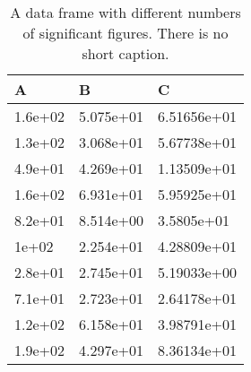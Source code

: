 \begin{table}[h!]
\caption{A data frame with different numbers of significant figures. There is no short caption.}\label{df2}\begin{center}
\begin{tabular}{l l l }

\hline
A	&	B	&	C\\ 
\hline
1.6e+02	&	5.075e+01	&	6.51656e+01\\ 
1.3e+02	&	3.068e+01	&	5.67738e+01\\ 
4.9e+01	&	4.269e+01	&	1.13509e+01\\ 
1.6e+02	&	6.931e+01	&	5.95925e+01\\ 
8.2e+01	&	8.514e+00	&	3.5805e+01\\ 
1e+02	&	2.254e+01	&	4.28809e+01\\ 
2.8e+01	&	2.745e+01	&	5.19033e+00\\ 
7.1e+01	&	2.723e+01	&	2.64178e+01\\ 
1.2e+02	&	6.158e+01	&	3.98791e+01\\ 
1.9e+02	&	4.297e+01	&	8.36134e+01\\ 
\hline\end{tabular}
\end{center}
\end{table}